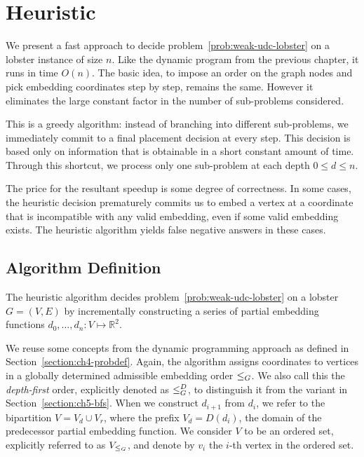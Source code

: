 \chapter{Heuristic}
\label{ch:heuristic}

We present a fast approach to decide problem~\ref{prob:weak-udc-lobster} on a lobster instance of size $n$. Like the dynamic program from the previous chapter, it runs in time $O(n)$. The basic idea, to impose an order on the graph nodes and pick embedding coordinates step by step, remains the same. However it eliminates the large constant factor in the number of sub-problems considered.

This is a greedy algorithm: instead of branching into different sub-problems, we immediately commit to a final placement decision at every step. This decision is based only on information that is obtainable in a short constant amount of time. Through this shortcut, we process only one sub-problem at each depth $0 \leq d \leq n$.

The price for the resultant speedup is some degree of correctness. In some cases, the heuristic decision prematurely commits us to embed a vertex at a coordinate that is incompatible with any valid embedding, even if some valid embedding exists. The heuristic algorithm yields false negative answers in these cases.

\section{Algorithm Definition}

The heuristic algorithm decides problem~\ref{prob:weak-udc-lobster} on a lobster $G = (V, E)$ by incrementally constructing a series of partial embedding functions $d_0, \ldots, d_n : V \mapsto \mathbb R^2$.

We reuse some concepts from the dynamic programming approach as defined in Section~\ref{section:ch4-probdef}. Again, the algorithm assigns coordinates to vertices in a globally determined admissible embedding order $\leq_G$. We also call this the \emph{depth-first} order, explicitly denoted as $\leq_G^D$, to distinguish it from the variant in Section~\ref{section:ch5-bfs}. When we construct $d_{i+1}$ from $d_i$, we refer to the bipartition $V = V_d \cup V_r$, where the prefix $V_d = D(d_i)$, the domain of the predecessor partial embedding function. We consider $V$ to be an ordered set, explicitly referred to as $V_{\leq_G}$, and denote by $v_i$ the $i$-th vertex in the ordered set.

